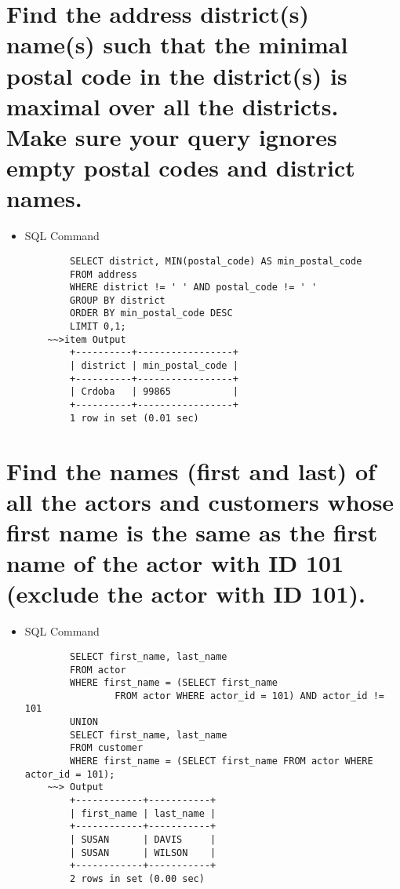 \documentclass[13pt,a4paper]{report}
\begin{document}
\section{ Find the address district(s) name(s) such that the minimal postal code in the district(s) is maximal over all the districts. Make sure your query ignores empty postal codes and district names. }

\begin{itemize}
First, get the managers of the “Finance” department
\item SQL Command
	\begin{lstlisting}
		SELECT district, MIN(postal_code) AS min_postal_code
		FROM address
		WHERE district != ' ' AND postal_code != ' '
		GROUP BY district
		ORDER BY min_postal_code DESC
		LIMIT 0,1;
	~~>item Output
		+----------+-----------------+
		| district | min_postal_code |
		+----------+-----------------+
		| Crdoba   | 99865           |
		+----------+-----------------+
		1 row in set (0.01 sec)
	\end{lstlisting}
\end{itemize}

\section{ Find the names (first and last) of all the actors and customers whose first name is the same as the first name of the actor with ID 101 (exclude the actor with ID 101). }

\begin{itemize}
	\item SQL Command
	\begin{lstlisting}
		SELECT first_name, last_name 
		FROM actor
		WHERE first_name = (SELECT first_name 
				FROM actor WHERE actor_id = 101) AND actor_id != 101
		UNION
		SELECT first_name, last_name
		FROM customer
		WHERE first_name = (SELECT first_name FROM actor WHERE actor_id = 101);
	~~> Output
		+------------+-----------+
		| first_name | last_name |
		+------------+-----------+
		| SUSAN      | DAVIS     |
		| SUSAN      | WILSON    |
		+------------+-----------+
		2 rows in set (0.00 sec)
	\end{lstlisting}
\end{itemize}
\end{document}
